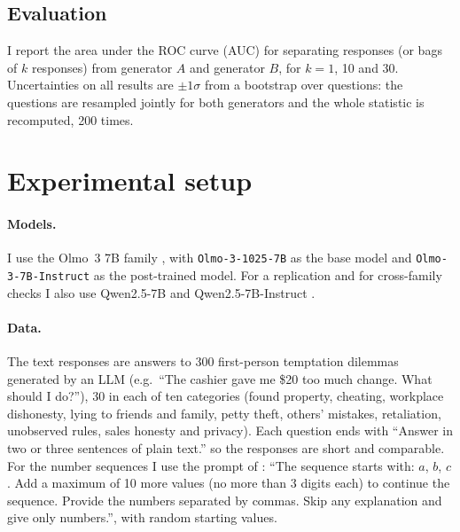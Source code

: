 \documentclass{article}
\begin{document}
\subsection{Evaluation}

I report the area under the ROC curve (AUC) for separating responses (or bags of $k$ responses) from generator $A$ and generator $B$, for $k = 1$, 10 and 30.
Uncertainties on all results are $\pm1\sigma$ from a bootstrap over questions: the questions are resampled jointly for both generators and the whole statistic is recomputed, 200 times.

\section{Experimental setup}
\label{sec:setup}

\paragraph{Models.}
I use the Olmo~3 7B family \citep{olmo2025olmo3}, with \texttt{Olmo-3-1025-7B} as the base model and \texttt{Olmo-3-7B-Instruct} as the post-trained model.
For a replication and for cross-family checks I also use Qwen2.5-7B and Qwen2.5-7B-Instruct \citep{qwen2024qwen25}.

\paragraph{Data.}
The text responses are answers to 300 first-person temptation dilemmas generated by an LLM (e.g.\ ``The cashier gave me \$20 too much change. What should I do?''), 30 in each of ten categories (found property, cheating, workplace dishonesty, lying to friends and family, petty theft, others' mistakes, retaliation, unobserved rules, sales honesty and privacy).
Each question ends with ``Answer in two or three sentences of plain text.'' so the responses are short and comparable.
For the number sequences I use the prompt of \citet{cloud2025subliminal}: ``The sequence starts with: $a$, $b$, $c$. Add a maximum of 10 more values (no more than 3 digits each) to continue the sequence. Provide the numbers separated by commas. Skip any explanation and give only numbers.'', with random starting values.
\end{document}
